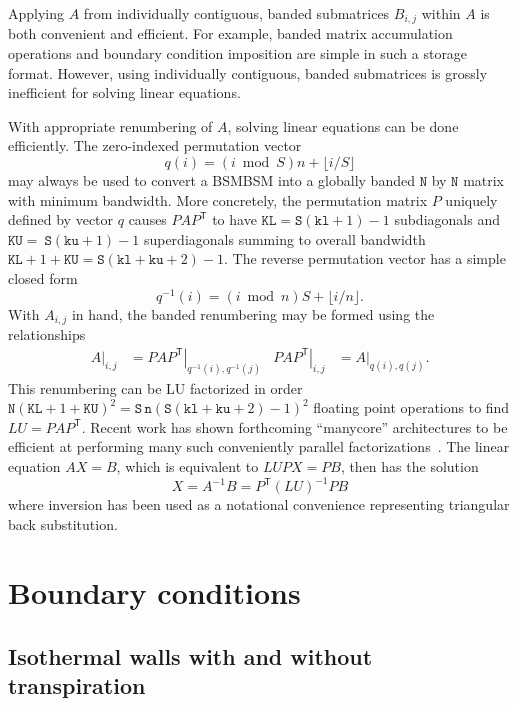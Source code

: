 \documentclass[letterpaper,11pt,nointlimits,reqno,draft]{amsbook}
\newcommand{\trans}[1]{{#1}^{\ensuremath{\mathsf{T}}}}
\begin{document}
Applying $A$ from individually contiguous, banded submatrices $B_{i,j}$ within
$A$ is both convenient and efficient.  For example, banded matrix accumulation
operations and boundary condition imposition are simple in such a storage
format.  However, using individually contiguous, banded submatrices is grossly
inefficient for solving linear equations.

With appropriate renumbering of $A$, solving linear equations can be done
efficiently.  The zero-indexed permutation vector \[q(i) =
\left(i\bmod{}S\right)n + \lfloor{}i/S\rfloor{}\] may always be used to convert
a BSMBSM into a globally banded $\mathtt{N}$ by $\mathtt{N}$ matrix with
minimum bandwidth.  More concretely, the permutation matrix $P$ uniquely
defined by vector $q$ causes $P A \trans{P}$ to have $\mathtt{KL} =
\mathtt{S}\left(\mathtt{kl}+1\right)-1$ subdiagonals and
$\mathtt{KU}=~\mathtt{S}\left(\mathtt{ku}+1\right)-1$ superdiagonals summing to
overall bandwidth $\mathtt{KL} + 1 + \mathtt{KU} = \mathtt{S}\left(\mathtt{kl}
+ \mathtt{ku} + 2\right)-1$.  The reverse permutation vector has a simple
closed form \[q^{-1}(i) = \left(i\bmod{}n\right)S + \lfloor{}i/n\rfloor{}.\]
With $A_{i,j}$ in hand, the banded renumbering may be formed using the
relationships
\begin{align}
    \label{eq:bsmbsm_renumbering}
       \left.A\right|_{i,j}
    &= \left.P A \trans{P}\right|_{q^{-1}(i),q^{-1}(j)}
    &
       \left.P A \trans{P}\right|_{i,j}
    &= \left.A\right|_{q(i),q(j)}.
\end{align}
This renumbering can be LU factorized in order $\mathtt{N}\left(\mathtt{KL} + 1
+ \mathtt{KU}\right)^2 =
\mathtt{S}\,\mathtt{n}\left(\mathtt{S}\left(\mathtt{kl} + \mathtt{ku} +
2\right)-1\right)^2$ floating point operations to find $LU = P A \trans{P}$.
Recent work has shown forthcoming ``manycore'' architectures to be efficient at
performing many such conveniently parallel
factorizations~\citep{Schulz2012Early}.  The linear equation $AX=B$, which is
equivalent to $LUPX=PB$, then has the solution \[X = A^{-1}B =
\trans{P}\left(LU\right)^{-1}PB\] where inversion has been used as a notational
convenience representing triangular back substitution.

\section{Boundary conditions}

\subsection{Isothermal walls with and without transpiration}
\end{document}
